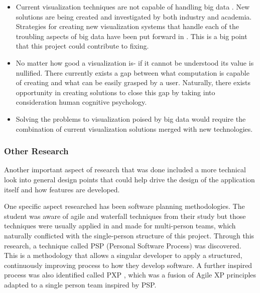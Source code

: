 \begin{itemize}
    \item Current visualization techniques are not capable of handling big data \cite[]{7918044}. New solutions are being created and investigated by both industry and academia. Strategies for creating new visualization systems that handle each of the troubling aspects of big data have been put forward in \cite[]{9523950}. This is a big point that this project could contribute to fixing.
    \item No matter how good a visualization is- if it cannot be understood its value is nullified. There currently exists a gap between what computation is capable of creating and what can be easily grasped by a user. Naturally, there exists opportunity in creating solutions to close this gap by taking into consideration human cognitive psychology. \cite{olshannikova_2015_visualizing} \cite{7918044} \cite{10.1007/978-3-030-44999-5_39}
    \item Solving the problems to visualization poised by big data would require the combination of current visualization solutions merged with new technologies. \cite[]{olshannikova_2015_visualizing}
\end{itemize}

\subsubsection{Other Research} \label{otherresearch}
Another important aspect of research that was done included a more technical look into general design points that could help drive the design of the application itself and how features are developed.

One specific aspect researched has been software planning methodologies. The student was aware of agile and waterfall techniques from their study but those techniques were usually applied in and made for multi-person teams, which naturally conflicted with the single-person structure of this project. Through this research, a technique called PSP \cite[]{493023} (Personal Software Process) was discovered. This is a methodology that allows a singular developer to apply a structured, continuously improving process to how they develop software. A further inspired process was also identified called PXP \cite[]{10.1145/1593105.1593127}, which was a fusion of Agile XP principles adapted to a single person team inspired by PSP.

